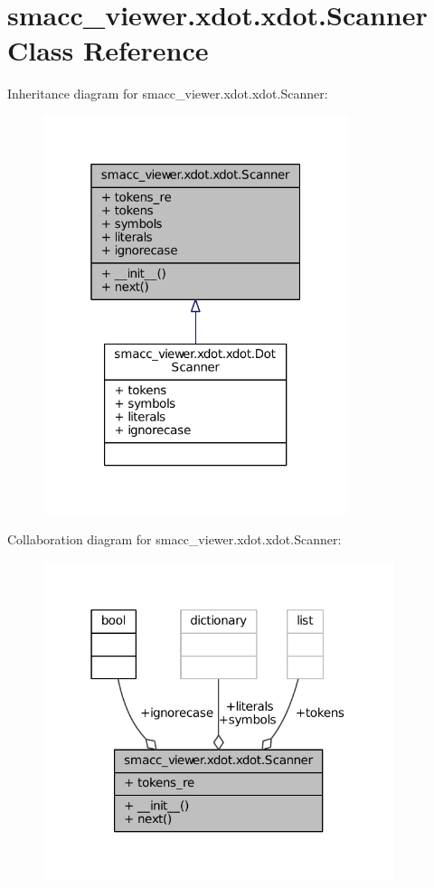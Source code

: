 \hypertarget{classsmacc__viewer_1_1xdot_1_1xdot_1_1Scanner}{}\section{smacc\+\_\+viewer.\+xdot.\+xdot.\+Scanner Class Reference}
\label{classsmacc__viewer_1_1xdot_1_1xdot_1_1Scanner}


Inheritance diagram for smacc\+\_\+viewer.\+xdot.\+xdot.\+Scanner\+:
\nopagebreak
\begin{figure}[H]
\begin{center}
\leavevmode
\includegraphics[width=253pt]{classsmacc__viewer_1_1xdot_1_1xdot_1_1Scanner__inherit__graph}
\end{center}
\end{figure}


Collaboration diagram for smacc\+\_\+viewer.\+xdot.\+xdot.\+Scanner\+:
\nopagebreak
\begin{figure}[H]
\begin{center}
\leavevmode
\includegraphics[width=291pt]{classsmacc__viewer_1_1xdot_1_1xdot_1_1Scanner__coll__graph}
\end{center}
\end{figure}
